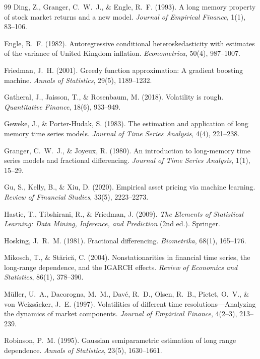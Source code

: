 \documentclass[12pt]{article}
\begin{document}
\begin{thebibliography}{99}
Ding, Z., Granger, C.~W.~J., \& Engle, R.~F. (1993).
\newblock A long memory property of stock market returns and a new model.
\newblock \textit{Journal of Empirical Finance}, 1(1), 83--106.

Engle, R.~F. (1982).
\newblock Autoregressive conditional heteroskedasticity with estimates of the variance of United Kingdom inflation.
\newblock \textit{Econometrica}, 50(4), 987--1007.

Friedman, J.~H. (2001).
\newblock Greedy function approximation: A gradient boosting machine.
\newblock \textit{Annals of Statistics}, 29(5), 1189--1232.

Gatheral, J., Jaisson, T., \& Rosenbaum, M. (2018).
\newblock Volatility is rough.
\newblock \textit{Quantitative Finance}, 18(6), 933--949.

Geweke, J., \& Porter-Hudak, S. (1983).
\newblock The estimation and application of long memory time series models.
\newblock \textit{Journal of Time Series Analysis}, 4(4), 221--238.

Granger, C.~W.~J., \& Joyeux, R. (1980).
\newblock An introduction to long-memory time series models and fractional differencing.
\newblock \textit{Journal of Time Series Analysis}, 1(1), 15--29.

Gu, S., Kelly, B., \& Xiu, D. (2020).
\newblock Empirical asset pricing via machine learning.
\newblock \textit{Review of Financial Studies}, 33(5), 2223--2273.

Hastie, T., Tibshirani, R., \& Friedman, J. (2009).
\newblock \textit{The Elements of Statistical Learning: Data Mining, Inference, and Prediction} (2nd ed.).
\newblock Springer.

Hosking, J.~R.~M. (1981).
\newblock Fractional differencing.
\newblock \textit{Biometrika}, 68(1), 165--176.

Mikosch, T., \& St\u{a}ric\u{a}, C. (2004).
\newblock Nonstationarities in financial time series, the long-range dependence, and the IGARCH effects.
\newblock \textit{Review of Economics and Statistics}, 86(1), 378--390.

M\"uller, U.~A., Dacorogna, M.~M., Dav\'e, R.~D., Olsen, R.~B., Pictet, O.~V., \& von Weizs\"acker, J.~E. (1997).
\newblock Volatilities of different time resolutions---Analyzing the dynamics of market components.
\newblock \textit{Journal of Empirical Finance}, 4(2--3), 213--239.

Robinson, P.~M. (1995).
\newblock Gaussian semiparametric estimation of long range dependence.
\newblock \textit{Annals of Statistics}, 23(5), 1630--1661.

\end{thebibliography}
\end{document}
